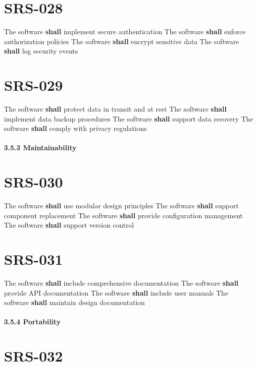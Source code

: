\section{SRS-028}\label{SRS-028}

The software \textbf{shall} implement secure authentication
The software \textbf{shall} enforce authorization policies
The software \textbf{shall} encrypt sensitive data
The software \textbf{shall} log security events

\section{SRS-029}\label{SRS-029}

The software \textbf{shall} protect data in transit and at rest
The software \textbf{shall} implement data backup procedures
The software \textbf{shall} support data recovery
The software \textbf{shall} comply with privacy regulations

\paragraph{3.5.3 Maintainability}

\section{SRS-030}\label{SRS-030}

The software \textbf{shall} use modular design principles
The software \textbf{shall} support component replacement
The software \textbf{shall} provide configuration management
The software \textbf{shall} support version control

\section{SRS-031}\label{SRS-031}

The software \textbf{shall} include comprehensive documentation
The software \textbf{shall} provide API documentation
The software \textbf{shall} include user manuals
The software \textbf{shall} maintain design documentation

\paragraph{3.5.4 Portability}

\section{SRS-032}\label{SRS-032}

